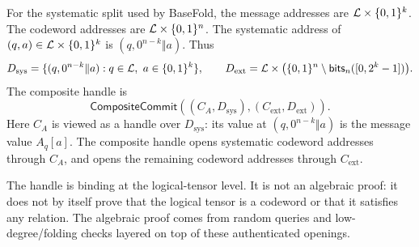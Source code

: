 For the systematic split used by BaseFold, the message addresses are
\(\mathcal L\times\{0,1\}^k\).  The codeword addresses are
\(\mathcal L\times\{0,1\}^n\).  The systematic address of
\((q,a)\in\mathcal L\times\{0,1\}^k\) is \((q,0^{n-k}\Vert a)\).  Thus
\[
  D_{\mathrm{sys}}
  =
  \{(q,0^{n-k}\Vert a):q\in\mathcal L,\ a\in\{0,1\}^k\},
  \qquad
  D_{\mathrm{ext}}
  =
  \mathcal L\times\bigl(\{0,1\}^n\setminus\mathsf{bits}_n([0,2^k-1])\bigr).
\]
The composite handle is
\[
  \mathsf{CompositeCommit}
  ((C_A,D_{\mathrm{sys}}),(C_{\mathrm{ext}},D_{\mathrm{ext}})).
\]
Here \(C_A\) is viewed as a handle over \(D_{\mathrm{sys}}\): its value at
\((q,0^{n-k}\Vert a)\) is the message value \(A_q[a]\).  The composite handle
opens systematic codeword addresses through \(C_A\), and opens the remaining
codeword addresses through \(C_{\mathrm{ext}}\).

The handle is binding at the logical-tensor level.  It is not an algebraic
proof: it does not by itself prove that the logical tensor is a codeword or
that it satisfies any relation.  The algebraic proof comes from random queries
and low-degree/folding checks layered on top of these authenticated openings.
